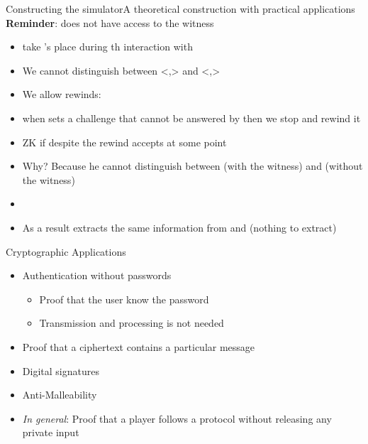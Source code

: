 \documentclass[handout]{beamer}
\begin{document}
\begin{frame}{Constructing the simulator}{A theoretical construction with practical applications}
\textbf{Reminder}: \siml does not have access to the witness
\pause
\begin{small}
\begin{itemize}
\setlength\itemsep{0.01em}
\item \siml take \prv's place during th interaction with \ver 
\pause
\item We cannot distinguish between <\siml,\ver> and <\prv,\ver>
\pause
\item We allow rewinds:
\pause
\item when \ver sets a challenge that cannot be answered by \siml then we stop and rewind it
\pause
\item ZK if despite the rewind \ver accepts at some point
\pause
\item Why? \pause
Because he cannot distinguish between \prv (with the witness) and \siml (without the witness) 
\pause
\item {}
\pause
\item As a result \ver extracts the same information from \prv and \siml (nothing to extract)

\end{itemize}
\end{small}
\end{frame}

\begin{frame}{Cryptographic Applications}
\begin{itemize}
\item Authentication without passwords
\begin{itemize}
\item Proof that the user know the password
\item Transmission and processing is not needed
\end{itemize}
\pause
\item Proof that a ciphertext contains a particular message
\pause
\item Digital signatures
\item Anti-Malleability
\pause 
\item \emph{In general}: Proof that a player follows a protocol without releasing any private input
\end{itemize}
\end{frame}
\end{document}
